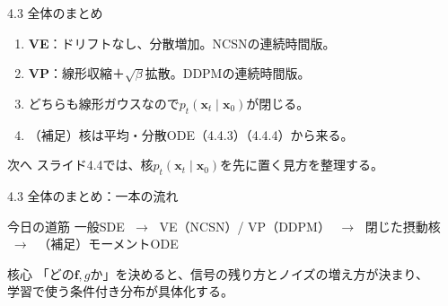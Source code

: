 \asmain
\begin{frame}{4.3 全体のまとめ}
    \begin{enumerate}
        \item \textbf{VE}：ドリフトなし、分散増加。NCSNの連続時間版。
        \item \textbf{VP}：線形収縮＋$\sqrt{\beta}$拡散。DDPMの連続時間版。
        \item どちらも線形ガウスなので$p_t(\bm{x}_t\mid\bm{x}_0)$が閉じる。
        \item （補足）核は平均・分散ODE（4.4.3）（4.4.4）から来る。
    \end{enumerate}
    \begin{block}{次へ}
        スライド4.4では、核$p_t(\bm{x}_t\mid\bm{x}_0)$を先に置く見方を整理する。
    \end{block}
\end{frame}
\asmain
\begin{frame}{4.3 全体のまとめ：一本の流れ}
    \begin{block}{今日の道筋}
        一般SDE
        $\;\to\;$
        VE（NCSN）/ VP（DDPM）
        $\;\to\;$
        閉じた摂動核
        $\;\to\;$
        （補足）モーメントODE
    \end{block}
    \begin{block}{核心}
        「どの$\bm{f},g$か」を決めると、信号の残り方とノイズの増え方が決まり、\\
        学習で使う条件付き分布が具体化する。
    \end{block}
\end{frame}
